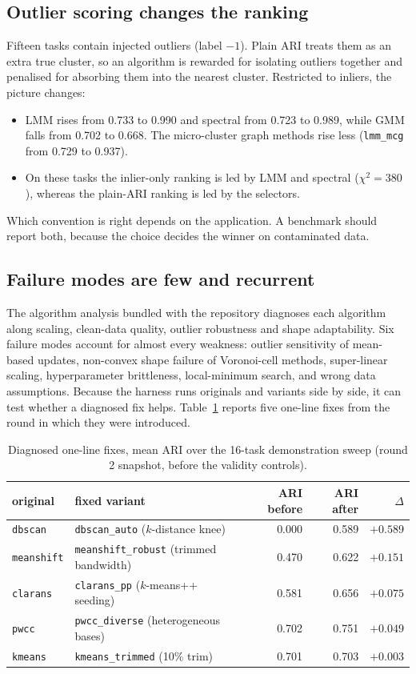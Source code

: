\documentclass[11pt,a4paper]{article}
\newcommand{\code}[1]{\texttt{#1}}
\begin{document}
\subsection{Outlier scoring changes the ranking}
Fifteen tasks contain injected outliers (label $-1$). Plain ARI treats them as
an extra true cluster, so an algorithm is rewarded for isolating outliers
together and penalised for absorbing them into the nearest cluster.
Restricted to inliers, the picture changes:
\begin{itemize}
  \item LMM rises from 0.733 to 0.990 and spectral from 0.723 to 0.989, while
  GMM falls from 0.702 to 0.668. The micro-cluster graph methods rise less
  (\code{lmm\_mcg} from 0.729 to 0.937).
  \item On these tasks the inlier-only ranking is led by LMM and spectral
  ($\chi^2 = 380$), whereas the plain-ARI ranking is led by the selectors.
\end{itemize}
Which convention is right depends on the application. A benchmark should
report both, because the choice decides the winner on contaminated data.

\subsection{Failure modes are few and recurrent}
The algorithm analysis bundled with the repository diagnoses each algorithm
along scaling, clean-data quality, outlier robustness and shape adaptability.
Six failure modes account for almost every weakness: outlier sensitivity of
mean-based updates, non-convex shape failure of Voronoi-cell methods,
super-linear scaling, hyperparameter brittleness, local-minimum search, and
wrong data assumptions. Because the harness runs originals and variants side
by side, it can test whether a diagnosed fix helps. Table~\ref{tab:fixes}
reports five one-line fixes from the round in which they were introduced.

\begin{table}[t]
  \centering
  \caption{Diagnosed one-line fixes, mean ARI over the 16-task demonstration
  sweep (round 2 snapshot, before the validity controls).}
  \label{tab:fixes}
  \begin{tabular}{llrrr}
    \toprule
    original & fixed variant & ARI before & ARI after & $\Delta$ \\
    \midrule
    \code{dbscan} & \code{dbscan\_auto} ($k$-distance knee) & 0.000 & 0.589 & $+0.589$ \\
    \code{meanshift} & \code{meanshift\_robust} (trimmed bandwidth) & 0.470 & 0.622 & $+0.151$ \\
    \code{clarans} & \code{clarans\_pp} ($k$-means++ seeding) & 0.581 & 0.656 & $+0.075$ \\
    \code{pwcc} & \code{pwcc\_diverse} (heterogeneous bases) & 0.702 & 0.751 & $+0.049$ \\
    \code{kmeans} & \code{kmeans\_trimmed} (10\% trim) & 0.701 & 0.703 & $+0.003$ \\
    \bottomrule
  \end{tabular}
\end{table}
\end{document}
